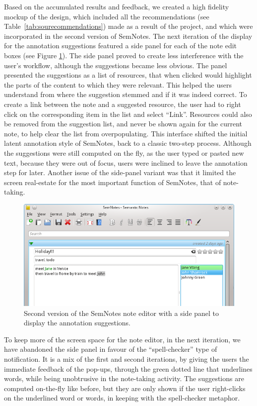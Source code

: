 Based on the accumulated results and feedback, we created a high fidelity mockup of the design, which included all the recommendations (see Table~\ref{tab:sourecommendations}) made as a result of the project, and which were incorporated in the second version of SemNotes.
The next iteration of the display for the annotation suggestions featured a side panel for each of the note edit boxes (see Figure \ref{fig:sidepanel}). The side panel proved to create less interference with the user's workflow, although the suggestions became less obvious. The panel presented the suggestions as a list of resources, that when clicked would highlight the parts of the content to which they were relevant. This helped the users understand from where the suggestion stemmed and if it was indeed correct. To create a link between the note and a suggested resource, the user had to right click on the corresponding item in the list and select ``Link''. Resources could also be removed from the suggestion list, and never be shown again for the current note, to help clear the list from overpopulating. This interface shifted the initial latent annotation style of SemNotes, back to a classic two-step process. Although the suggestions were still computed on the fly, as the user typed or pasted new text, 
because they were out of focus, users were inclined to leave the annotation step for later. Another issue of the side-panel variant was that it limited the screen real-estate for the most important function of SemNotes, that of note-taking. 

\begin{figure}[tb]
 \includegraphics[width=\linewidth]{chapters/core/img/linkednote_v2}
\caption{Second version of the SemNotes note editor with a side panel to display the annotation suggestions.}
\label{fig:sidepanel}
\end{figure} 

To keep more of the screen space for the note editor, in the next iteration, we have abandoned the side panel in favour of the ``spell-checker'' type of notification. It is a mix of the first and second iterations, by giving the users the immediate feedback of the pop-ups, through the green dotted line that underlines words, while being unobtrusive in the note-taking activity. The suggestions are computed on-the-fly like before, but they are only shown if the user right-clicks on the underlined word or words, in keeping with the spell-checker metaphor.

